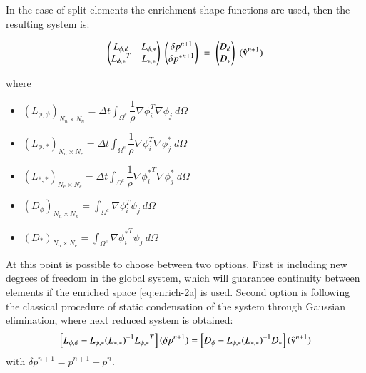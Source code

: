 In the case of split elements the enrichment shape functions are used, then the resulting system is:

  \begin{equation*}
   \begin{pmatrix}
      L_{\phi,\phi} & L_{\phi,*}\\
      {L_{\phi,*}}^T & L_{*,*}
   \end{pmatrix}\;
    \begin{pmatrix}
      \delta p^{n+1}\\
      \delta {p^*}^{n+1}
   \end{pmatrix}\; = \;
   \begin{pmatrix}
      D_{\phi}\\
      D_*
   \end{pmatrix}\;
   (\hat{\mathbf{v}}^{n+1})
   \label{poisson}
\end{equation*}

where
\begin{itemize}
 \item ${(L_{\phi,\phi})}_{N_n\times N_n} = \Delta t \displaystyle \int_{\Omega^e} \dfrac{1}{\rho} \nabla \phi_i^T \nabla \phi_j \ d\Omega$
 \item ${(L_{\phi,*})}_{N_n\times N_e} = \Delta t \displaystyle \int_{\Omega^e} \dfrac{1}{\rho} \nabla \phi_i^T \nabla \phi_j^* \ d\Omega$
 \item ${(L_{*,*})}_{N_e\times N_e} = \Delta t \displaystyle \int_{\Omega^e} \dfrac{1}{\rho} \nabla {\phi_i^*}^T \nabla \phi_j^* \ d\Omega$
 \item ${(D_{\phi})}_{N_n\times N_n} = \displaystyle \int_{\Omega^e} \nabla \phi_i^T \psi_j \ d\Omega$
 \item ${(D_*)}_{N_n\times N_e} = \displaystyle \int_{\Omega^e}  \nabla {\phi_i^*}^T \psi_j \ d\Omega$
\end{itemize}

At this point is possible to choose between two options. First is including new degrees of freedom in the global system, which will guarantee continuity between elements if the enriched space \ref{eq:enrich-2a} is used. Second option is following the classical procedure of static condensation of the system through Gaussian elimination\cite{Felippa04}, where next reduced system is obtained:
  \begin{equation}
   \left[L_{\phi,\phi} - L_{\phi,*}{(L_{*,*})}^{-1}{L_{\phi,*}}^T\right](\delta p^{n+1}) = \left[D_{\phi}- L_{\phi,*}{(L_{*,*})}^{-1}D_{*}\right](\hat{\mathbf{v}}^{n+1})
   \label{condensing}
  \end{equation}
with $\delta p^{n+1} = p^{n+1}-p^{n}$.

